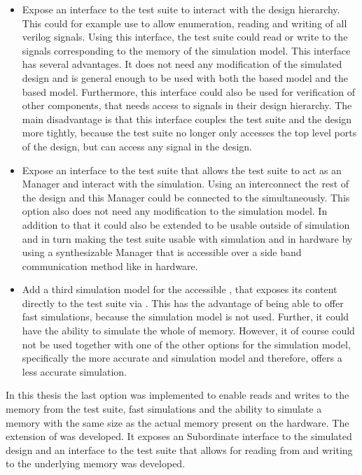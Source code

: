 \begin{itemize}
  \item Expose an interface to the test suite to interact with the design hierarchy. This could for example use \VPI{} to allow enumeration, reading and writing of all verilog signals. Using this interface, the test suite could read or write to the signals corresponding to the memory of the \DRAM{} simulation model. This interface has several advantages. It does not need any modification of the simulated design and is general enough to be used with both the \AXIBRAMController{} based model and the \MIG{} based model. Furthermore, this interface could also be used for verification of other components, that needs access to signals in their design hierarchy. The main disadvantage is that this interface couples the test suite and the \FPGA{} design more tightly, because the test suite no longer only accesses the top level ports of the design, but can access any signal in the \FPGA{} design.
  \item Expose an interface to the test suite that allows the test suite to act as an \AXI{} Manager and interact with the simulation. Using an \AXI{} interconnect the rest of the \FPGA{} design and this \AXI{} Manager could be connected to the \AXI{} \DRAM{} simultaneously. This option also does not need any modification to the \AXI{} \DRAM{} simulation model. In addition to that it could also be extended to be usable outside of simulation and in turn making the test suite usable with simulation and in hardware by using a synthesizable \AXI{} Manager that is accessible over a side band communication method like \JTAG{} in hardware.
  \item Add a third simulation model for the \AXI{} accessible \DRAM{}, that exposes its content directly to the test suite via \flange{}. This has the advantage of being able to offer fast simulations, because the \DDR{} simulation model is not used. Further, it could have the ability to simulate the whole \DDRSIZE{} of memory. However, it of course could not be used together with one of the other options for the \AXI{} \DRAM{} simulation model, specifically the more accurate \MIG{} and \DDR{} simulation model and therefore, offers a less accurate simulation.
\end{itemize}
In this thesis the last option was implemented to enable reads and writes to the memory from the test suite, fast simulations and the ability to simulate a memory with the same size as the actual memory present on the hardware. The \flangedram{} extension of \flange{} was developed. It exposes an \AXI{} Subordinate interface to the simulated \FPGA{} design and an interface to the test suite that allows for reading from and writing to the underlying memory was developed.
